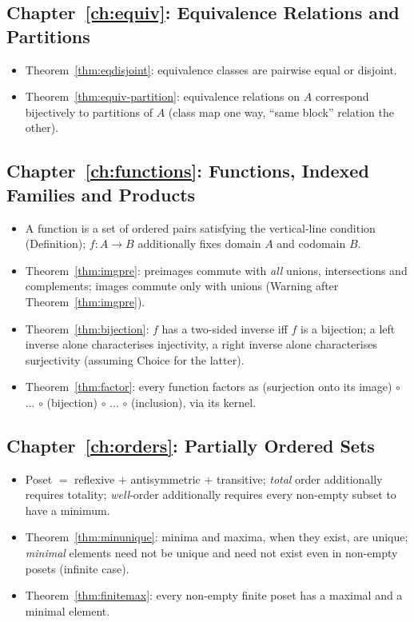 \subsection*{Chapter~\ref{ch:equiv}: Equivalence Relations and Partitions}
\begin{itemize}
	\item Theorem~\ref{thm:eqdisjoint}: equivalence classes are pairwise equal or disjoint.
	\item Theorem~\ref{thm:equiv-partition}: equivalence relations on $A$ correspond bijectively to partitions of $A$ (class map one way, ``same block'' relation the other).
\end{itemize}

\subsection*{Chapter~\ref{ch:functions}: Functions, Indexed Families and Products}
\begin{itemize}
	\item A function is a set of ordered pairs satisfying the vertical-line condition (Definition); $f:A\to B$ additionally fixes domain $A$ and codomain $B$.
	\item Theorem~\ref{thm:imgpre}: preimages commute with \emph{all} unions, intersections and complements; images commute only with unions (Warning after Theorem~\ref{thm:imgpre}).
	\item Theorem~\ref{thm:bijection}: $f$ has a two-sided inverse iff $f$ is a bijection; a left inverse alone characterises injectivity, a right inverse alone characterises surjectivity (assuming Choice for the latter).
	\item Theorem~\ref{thm:factor}: every function factors as (surjection onto its image) $\circ$ ... $\circ$ (bijection) $\circ$ ... $\circ$ (inclusion), via its kernel.
\end{itemize}

\subsection*{Chapter~\ref{ch:orders}: Partially Ordered Sets}
\begin{itemize}
	\item Poset $=$ reflexive $+$ antisymmetric $+$ transitive; \emph{total} order additionally requires totality; \emph{well}-order additionally requires every non-empty subset to have a minimum.
	\item Theorem~\ref{thm:minunique}: minima and maxima, when they exist, are unique; \emph{minimal} elements need not be unique and need not exist even in non-empty posets (infinite case).
	\item Theorem~\ref{thm:finitemax}: every non-empty finite poset has a maximal and a minimal element.
\end{itemize}

